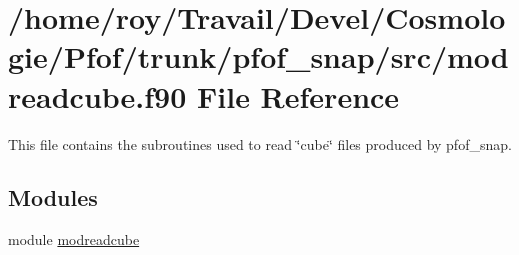 \hypertarget{modreadcube_8f90}{}\section{/home/roy/\+Travail/\+Devel/\+Cosmologie/\+Pfof/trunk/pfof\+\_\+snap/src/modreadcube.f90 File Reference}
\label{modreadcube_8f90}


This file contains the subroutines used to read \char`\"{}cube\char`\"{} files produced by pfof\+\_\+snap.  


\subsection*{Modules}
\begin{DoxyCompactItemize}
\item 
module \hyperlink{namespacemodreadcube}{modreadcube}
\end{DoxyCompactItemize}
